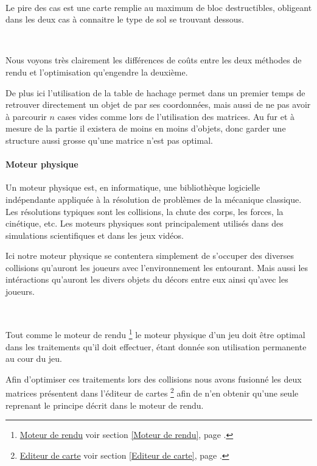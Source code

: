			$\,$
			
			Le pire des cas est une carte remplie au maximum de bloc destructibles,
			obligeant dans les deux cas à connaitre le type de sol se trouvant dessous.
			
			$\,$
			
			Nous voyons très clairement les différences de coûts entre les deux méthodes
			de rendu et l'optimisation qu'engendre la deuxième.
			
			De plus ici l'utilisation de la table de hachage permet dans un premier temps de
			retrouver directement un objet de par ses coordonnées, mais aussi de ne pas
			avoir à parcourir $n$ cases vides comme lors de l'utilisation des matrices.
			Au fur et à mesure de la partie il existera de moins en moins d'objets,
			donc garder une structure aussi grosse qu'une matrice n'est pas optimal.
		
		\paragraph{Moteur physique\\}
		
			\hypertarget{Moteur physique}{}
			\label{Moteur physique}
			
			Un moteur physique est, en informatique, une bibliothèque logicielle 
			indépendante appliquée à la résolution de problèmes de la mécanique
			classique.  Les résolutions typiques sont les collisions, la chute des corps,
			les forces, la cinétique, etc.
			Les moteurs physiques sont principalement utilisés dans des simulations 
			scientifiques et dans les jeux vidéos.
			
			
			Ici notre moteur physique se contentera simplement de s'occuper des diverses
			collisions qu'auront les joueurs avec l'environnement les entourant. Mais
			aussi les intéractions qu'auront les divers objets du décors entre eux
			ainsi qu'avec les joueurs.

			$\,$		
			
			Tout comme le moteur de rendu
			\footnote{
				\hyperlink{Moteur de rendu}{Moteur de rendu}
				\og voir section \ref{Moteur de rendu}, page \pageref{Moteur de rendu}.\fg
			}
			le moteur physique d'un jeu doit être optimal dans les traitements qu'il doit
			effectuer, étant donnée son utilisation permanente au cour du jeu.
			
			
			Afin d'optimiser ces traitements lors des collisions nous avons fusionné les
			deux matrices présentent dans l'éditeur de cartes
			\footnote{
				\hyperlink{Editeur de carte}{Editeur de carte}
				\og voir section \ref{Editeur de carte}, page \pageref{Editeur de carte}.\fg
			}
			afin de n'en obtenir qu'une seule reprenant le principe décrit dans le moteur
			de rendu\footnotemark[2].
			
